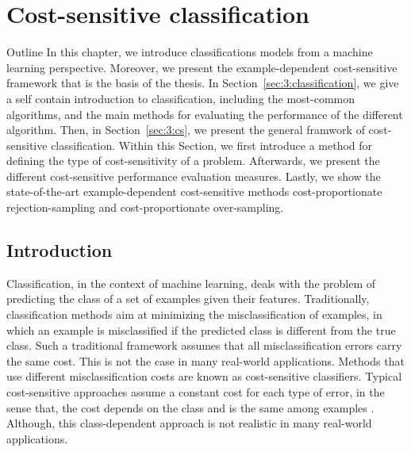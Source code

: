 \chapter{Cost-sensitive classification}\label{ch:3}

\begin{remark}{Outline}
In this chapter, we introduce classifications models from a machine learning perspective. 
Moreover, we present the example-dependent cost-sensitive framework that is the basis of the 
thesis. In Section~\ref{sec:3:classification}, we give a self contain introduction to 
classification, including the most-common algorithms, and the main methods for evaluating the 
performance of the different algorithm. Then, in Section~\ref{sec:3:cs}, we present the general 
framwork of cost-sensitive classification. Within this Section, we first introduce a method for 
defining the type of cost-sensitivity of a problem. Afterwards, we present the different 
cost-sensitive performance evaluation measures. Lastly, we show the state-of-the-art 
example-dependent cost-sensitive methods cost-proportionate rejection-sampling and 
cost-proportionate over-sampling.
\end{remark}


\section{Introduction}
\label{sec:3:intro}

  Classification, in the context of machine learning, deals with the problem of predicting the class
  of a set of examples given their features. Traditionally, classification methods aim at 
  minimizing the misclassification of examples, in which an example is misclassified if the 
  predicted class is different from the true class. Such a traditional framework assumes that all 
  misclassification errors carry the same cost. This is not the case in many real-world 
  applications. Methods that use different misclassification costs are known as cost-sensitive 
  classifiers. Typical cost-sensitive approaches assume a constant cost for each type of error, in 
  the sense that, the cost depends on the class and is the same among examples
  \citep{Elkan2001,Kim2012}. Although, this class-dependent approach is not realistic in many 
  real-world applications.
  
